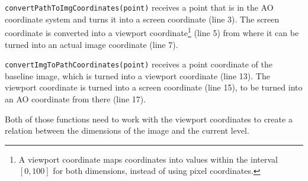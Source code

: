 \texttt{convertPathToImgCoordinates(point)} receives a point that is in the AO coordinate system and turns it into a screen coordinate (line 3). The screen coordinate is converted into a viewport coordinate\footnote{
	A viewport coordinate maps coordinates into values within the interval $[0, 100]$ for both dimensions, instead of using pixel coordinates\cite{web:openseadragon}.
} (line 5) from where it can be turned into an actual image coordinate (line 7).

\texttt{convertImgToPathCoordinates(point)} receives a point coordinate of the baseline image, which is turned into a viewport coordinate (line 13). The viewport coordinate is turned into a screen coordinate (line 15), to be turned into an AO coordinate from there (line 17).

Both of those functions need to work with the viewport coordinates to create a relation between the dimensions of the image and the current level.

